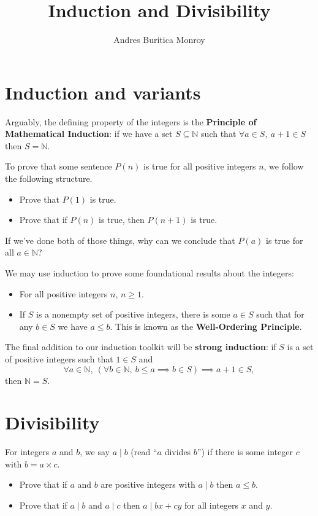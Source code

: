 \documentclass{article}
\title{Induction and Divisibility}
\author{Andres Buritica Monroy}
\date{}
\begin{document}
\maketitle
\section{Induction and variants}
Arguably, the defining property of the integers is the \textbf{Principle of
	Mathematical Induction}: if we have a set $S\subseteq\mathbb N$ such that
$\forall a\in S,\ a+1\in S$ then $S=\mathbb N$.

To prove that some sentence $P(n)$ is true for all positive integers $n$, we
follow the following structure.
\begin{itemize}
	\item Prove that $P(1)$ is true.
	\item Prove that if $P(n)$ is true, then $P(n+1)$ is true.
\end{itemize}
If we've done both of those things, why can we conclude that $P(a)$ is true
for all $a\in\mathbb N$?

We may use induction to prove some foundational results about the integers:
\begin{itemize}
	\item For all positive integers $n$, $n\ge 1$.
	\item If $S$ is a nonempty set of positive integers, there is some $a\in
		      S$ such that for any $b\in S$ we have $a\le b$.
	      This is known as the \textbf{Well-Ordering Principle}.
\end{itemize}

The final addition to our induction toolkit will be \textbf{strong induction}:
if $S$ is a set of positive integers such that $1\in S$ and
\[\forall a\in \mathbb N,\ (\forall b\in\mathbb N,\ b\le a\implies b\in
	S)\implies a+1\in S,\]
then $\mathbb N=S$.
\section{Divisibility}
For integers $a$ and $b$, we say $a\mid b$ (read ``$a$ divides
$b$'') if there is some integer $c$ with $b=a\times c$.
\begin{itemize}
	\item Prove that if $a$ and $b$ are positive integers with $a\mid b$ then
	      $a\le b$.
	\item Prove that if $a\mid b$ and $a\mid c$ then $a\mid bx+cy$ for all
	      integers $x$ and $y$.
\end{itemize}
\end{document}
